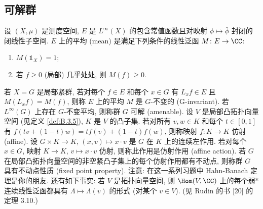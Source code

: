 \subsection{可解群}

设 $(X, \mu)$ 是测度空间, $E$ 是 $L^{\infty}(X)$ 的包含常值函数且对映射 $\phi \longmapsto \bar{\phi}$ 封闭的闭线性子空间. $E$ 上的平均 (mean) 是满足下列条件的线性泛函 $M \colon E \to \CC$:
\begin{enumerate}
\item[(i)] $M(\mathbb{1}_X) = 1$;
\item[(ii)] 若 $f \geq 0$ (局部) 几乎处处, 则 $M(f) \geq 0$.
\end{enumerate}
若 $X = G$ 是局部紧群, 若对每个 $f \in E$ 和每个 $x \in G$ 有 $L_xf \in E$ 且 $M(L_xf) = M(f)$, 则称 $E$ 上的平均 $M$ 是 $G$-不变的 (G-invariant).
若 $L^{\infty}(G)$ 上存在 $G$-不变平均, 则称群 $G$ 可解 (amenable).
设 $V$ 是局部凸拓扑向量空间 (见定义 \ref{def:B.3.5}), $K$ 是 $V$ 的凸子集. 若对所有 $v, w \in K$ 和每个 $t \in [0,1]$ 有 $f(tv + (1-t)w) = tf(v) + (1-t)f(w)$, 则称映射 $f \colon K \to K$ 仿射 (affine). 设 $G \times K \to K$, $(x, v) \longmapsto x \cdot v$ 是 $G$ 在 $K$ 上的连续左作用. 若对每个 $x \in G$, 映射 $K \to K$, $v \longmapsto x \cdot v$ 仿射, 则称此作用是仿射作用 (affine action).
若 $G$ 在局部凸拓扑向量空间的非空紧凸子集上的每个仿射作用都有不动点, 则称群 $G$ 具有不动点性质 (fixed point property).
注意: 在这一系列习题中 Hahn-Banach 定理是你的朋友. 还有如下事实: 若 $V$ 是拓扑向量空间, 则 $\Hom(V, \CC)$ 上的每个弱*连续线性泛函都具有 $\Lambda \longmapsto \Lambda(v)$ 的形式 (对某个 $v \in V$). (见 Rudin 的书 {[}20{]} 的定理 3.10.)

